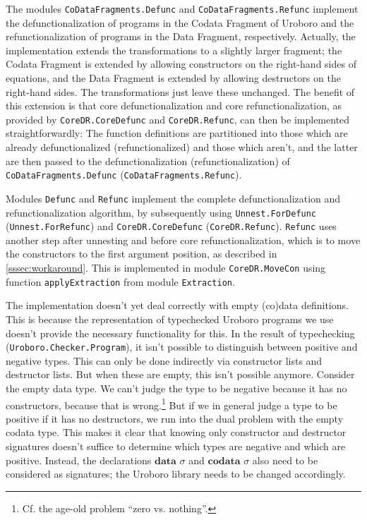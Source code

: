 The modules \texttt{CoDataFragments.Defunc} and \texttt{CoDataFragments.Refunc} implement the defunctionalization of programs in the Codata Fragment of Uroboro and the refunctionalization of programs in the Data Fragment, respectively. Actually, the implementation extends the transformations to a slightly larger fragment; the Codata Fragment is extended by allowing constructors on the right-hand sides of equations, and the Data Fragment is extended by allowing destructors on the right-hand sides. The transformations just leave these unchanged. The benefit of this extension is that core defunctionalization and core refunctionalization, as provided by \texttt{CoreDR.CoreDefunc} and \texttt{CoreDR.Refunc}, can then be implemented straightforwardly: The function definitions are partitioned into those which are already defunctionalized (refunctionalized) and those which aren't, and the latter are then passed to the defunctionalization (refunctionalization) of \texttt{CoDataFragments.Defunc} (\texttt{CoDataFragments.Refunc}).

Modules \texttt{Defunc} and \texttt{Refunc} implement the complete defunctionalization and refunctionalization algorithm, by subsequently using \texttt{Unnest.ForDefunc} (\texttt{Unnest.ForRefunc}) and \texttt{CoreDR.CoreDefunc} (\texttt{CoreDR.Refunc}). \texttt{Refunc} uses another step after unnesting and before core refunctionalization, which is to move the constructors to the first argument position, as described in \autoref{sssec:workaround}. This is implemented in module \texttt{CoreDR.MoveCon} using function \texttt{applyExtraction} from module \texttt{Extraction}.

The implementation doesn't yet deal correctly with empty (co)data definitions. This is because the representation of typechecked Uroboro programs we use doesn't provide the necessary functionality for this. In the result of typechecking (\texttt{Uroboro.Checker.Program}), it isn't possible to distinguish between positive and negative types. This can only be done indirectly via  constructor lists and destructor lists. But when these are empty, this isn't possible anymore. Consider the empty data type. We can't judge the type to be negative because it has no constructors, because that is wrong.\footnote{Cf. the age-old problem ``zero vs. nothing''.} But if we in general judge a type to be positive if it has no destructors, we run into the dual problem with the empty codata type. This makes it clear that knowing only constructor and destructor signatures doesn't suffice to determine which types are negative and which are positive. Instead, the declarations $\textbf{data } \sigma$ and $\textbf{codata } \sigma$ also need to be considered as signatures; the Uroboro library needs to be changed accordingly.

